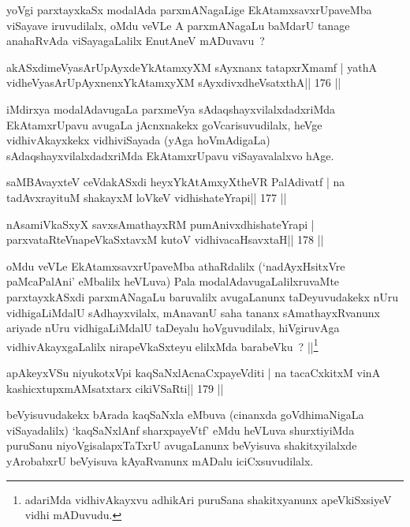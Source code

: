\begin{artha}
yoVgi parxtayxkaSx modalAda parxmANagaLige EkAtamxsavxrUpaveMba viSayave iruvudilalx, oMdu veVLe A parxmANagaLu baMdarU tanage anahaRvAda viSayagaLalilx EnutAneV mADuvavu~?
\end{artha}

\begin{shl}
akASxdimeVyasArUpAyxdeYkAtamxyXM sAyxnanx tatapxrXmamf |
yathA vidheVyasArUpAyxnenxYkAtamxyXM sAyxdivxdheVsatxthA\hfill || 176 ||
\end{shl}

\begin{artha}
iMdirxya modalAdavugaLa parxmeVya sAdaqshayxvilalxdadxriMda EkAtamxrUpavu avugaLa jAcnxnakekx goVcarisuvudilalx, heVge vidhivAkayxkekx vidhiviSayada (yAga hoVmAdigaLa) sAdaqshayxvilalxdadxriMda EkAtamxrUpavu viSayavalalxvo hAge.
\end{artha}

\begin{shl}
saMBAvayxteV ceVdakASxdi heyxYkAtAmxyXtheVR PalAdivatf |
na tadAvxrayituM shakayxM loVkeV vidhishateYrapi\hfill || 177 ||
\end{shl}

\begin{shl}
nAsamiVkaSxyX savxsAmathayxRM pumAnivxdhishateYrapi |
parxvataRteV\s napeVkaSxtavxM kutoV vidhivacaHsavxtaH\hfill || 178 ||
\end{shl}

\begin{artha}
oMdu veVLe EkAtamxsavxrUpaveMba athaRdalilx (`nadAyxHsitxVre paMcaPalAni' eMbalilx heVLuva) Pala modalAdavugaLalilxruvaMte parxtayxkASxdi parxmANagaLu baruvalilx avugaLanunx taDeyuvudakekx nUru vidhigaLiMdalU sAdhayxvilalx, mAnavanU saha tananx sAmathayxRvanunx ariyade nUru vidhigaLiMdalU taDeyalu hoVguvudilalx, hiVgiruvAga vidhivAkayxgaLalilx nirapeVkaSxteyu elilxMda barabeVku~? ||\footnote{adariMda vidhivAkayxvu adhikAri puruSana shakitxyanunx apeVkiSxsiyeV vidhi mADuvudu.}
\end{artha}


\begin{shl}
apAkeyxVSu niyukotxV\s pi kaqSaNxlAcnaCxpayeVditi |
na tacaCxkitxM vinA kashicxtupxmAMsatxtarx cikiVSaRti\hfill || 179 ||
\end{shl}

\begin{artha}
beVyisuvudakekx bArada kaqSaNxla eMbuva (cinanxda goVdhimaNigaLa viSayadalilx) `\footnotemark[1]kaqSaNxlAnf sharxpayeVtf' eMdu heVLuva shurxtiyiMda puruSanu niyoVgisalapxTaTxrU avugaLanunx beVyisuva shakitxyilalxde yArobabxrU beVyisuva kAyaRvanunx mADalu iciCxsuvudilalx.
\end{artha}

